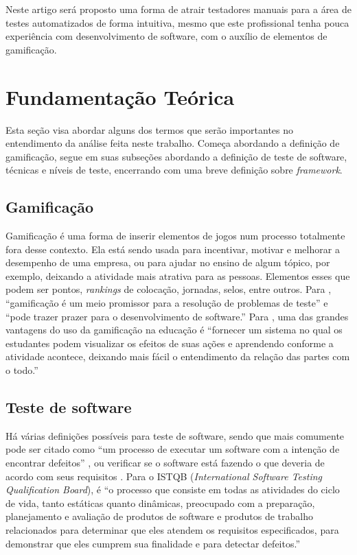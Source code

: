 \documentclass[twoside,english,brazilian]{UNISINOSartigo}
\begin{document}
Neste artigo será proposto uma forma de atrair testadores manuais para a área de testes automatizados de forma intuitiva, mesmo que este profissional tenha pouca experiência com desenvolvimento de software, com o auxílio de elementos de gamificação.
 


\section{Fundamentação Teórica}

Esta seção visa abordar alguns dos termos que serão importantes no entendimento da análise feita neste trabalho. Começa abordando a definição de gamificação, segue em suas subseções abordando a definição de teste de software, técnicas e níveis de teste, encerrando com uma breve definição sobre \textit{framework}.

\subsection{Gamificação}

Gamificação é uma forma de inserir elementos de jogos num processo totalmente fora desse contexto.
Ela está sendo usada para incentivar, motivar e melhorar a desempenho de uma empresa, ou para ajudar no ensino de algum tópico, por exemplo, deixando a atividade mais atrativa para as pessoas. Elementos esses que podem ser pontos, \textit{rankings} de colocação, jornadas, selos, entre outros. Para \cite{DeJesus}, ``gamificação é um meio promissor para a resolução de problemas de teste'' e ``pode trazer prazer para o desenvolvimento de software.'' Para \cite{Elgrably}, uma das grandes vantagens do uso da gamificação na educação é ``fornecer um sistema no qual os estudantes podem visualizar os efeitos de suas ações e aprendendo conforme a atividade acontece, deixando mais fácil o entendimento da relação das partes com o todo.''


\subsection{Teste de software}

Há várias definições possíveis para teste de software, sendo que mais comumente pode ser citado como ``um processo de executar um software com a intenção de encontrar defeitos'' \cite{Myers-1979}, ou verificar se o software está fazendo o que deveria de acordo com seus requisitos \cite{RiosMoreira-2002}. Para o ISTQB (\textit{International Software Testing Qualification Board}), é ``o processo que consiste em todas as atividades do ciclo de vida, tanto estáticas quanto dinâmicas, preocupado com a preparação, planejamento e avaliação de produtos de software e produtos de trabalho relacionados para determinar que eles atendem os requisitos especificados, para demonstrar que eles cumprem sua finalidade e para detectar defeitos.'' \cite{ISTQB-Glos12}
\end{document}
